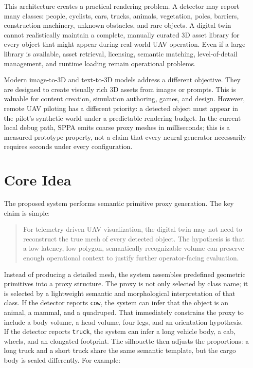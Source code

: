 ﻿\documentclass[11pt,a4paper]{article}
\begin{document}
This architecture creates a practical rendering problem. A detector may report
many classes: people, cyclists, cars, trucks, animals, vegetation, poles,
barriers, construction machinery, unknown obstacles, and rare objects. A digital
twin cannot realistically maintain a complete, manually curated 3D asset library
for every object that might appear during real-world UAV operation. Even if a
large library is available, asset retrieval, licensing, semantic matching,
level-of-detail management, and runtime loading remain operational problems.

Modern image-to-3D and text-to-3D models address a different objective. They are
designed to create visually rich 3D assets from images or prompts. This is
valuable for content creation, simulation authoring, games, and design. However,
remote UAV piloting has a different priority: a detected object must appear in
the pilot's synthetic world under a predictable rendering budget. In the current
local debug path, SPPA emits coarse proxy meshes in milliseconds; this is a
measured prototype property, not a claim that every neural generator necessarily
requires seconds under every configuration.

\section{Core Idea}

The proposed system performs semantic primitive proxy generation. The key claim
is simple:

\begin{quote}
For telemetry-driven UAV visualization, the digital twin may not need to
reconstruct the true mesh of every detected object. The hypothesis is that a
low-latency, low-polygon, semantically recognizable volume can preserve enough
operational context to justify further operator-facing evaluation.
\end{quote}

Instead of producing a detailed mesh, the system assembles predefined geometric
primitives into a proxy structure. The proxy is not only selected by class name;
it is selected by a lightweight semantic and morphological interpretation of
that class. If the detector reports \texttt{cow}, the system can infer that the
object is an animal, a mammal, and a quadruped. That immediately constrains the
proxy to include a body volume, a head volume, four legs, and an orientation
hypothesis. If the detector reports \texttt{truck}, the system can infer a long
vehicle body, a cab, wheels, and an elongated footprint. The silhouette then
adjusts the proportions: a long truck and a short truck share the same semantic
template, but the cargo body is scaled differently. For example:
\end{document}
